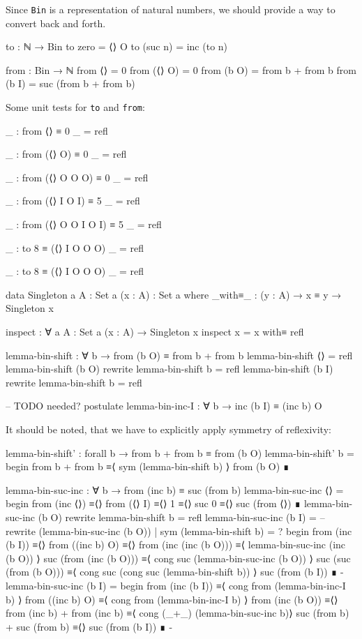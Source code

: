 Since \verb_Bin_ is a representation of natural numbers, we should provide
a way to convert back and forth.
\begin{code}
to : ℕ → Bin
to zero = ⟨⟩ O
to (suc n) = inc (to n)

from : Bin → ℕ
from ⟨⟩ = 0
from (⟨⟩ O) = 0
from (b O) = from b + from b
from (b I) = suc (from b + from b)
\end{code}

Some unit tests for \verb+to+ and \verb+from+:
\begin{code}
_ : from ⟨⟩ ≡ 0
_ = refl

_ : from (⟨⟩ O) ≡ 0
_ = refl

_ : from (⟨⟩ O O O) ≡ 0
_ = refl

_ : from (⟨⟩ I O I) ≡ 5
_ = refl

_ : from (⟨⟩ O O I O I) ≡ 5
_ = refl

_ : to 8 ≡ (⟨⟩ I O O O)
_ = refl

_ : to 8 ≡ (⟨⟩ I O O O)
_ = refl
\end{code}

\begin{code}
data Singleton {a} {A : Set a} (x : A) : Set a where
  _with≡_ : (y : A) → x ≡ y → Singleton x

inspect : ∀ {a} {A : Set a} (x : A) → Singleton x
inspect x = x with≡ refl

lemma-bin-shift : ∀ b → from (b O) ≡ from b + from b
lemma-bin-shift ⟨⟩ = refl
lemma-bin-shift (b O) rewrite lemma-bin-shift b = refl
lemma-bin-shift (b I) rewrite lemma-bin-shift b = refl

-- TODO needed?
postulate lemma-bin-inc-I : ∀ b → inc (b I) ≡ (inc b) O
\end{code}

It should be noted, that we have to explicitly apply symmetry of reflexivity:
\begin{code}
lemma-bin-shift' : forall b → from b + from b ≡ from (b O)
lemma-bin-shift' b =
  begin
    from b + from b
  ≡⟨ sym (lemma-bin-shift b) ⟩
   from (b O)
  ∎

lemma-bin-suc-inc : ∀ b → from (inc b) ≡ suc (from b)
lemma-bin-suc-inc ⟨⟩ =
  begin
    from (inc ⟨⟩)
  ≡⟨⟩
    from (⟨⟩ I)
  ≡⟨⟩
    1
  ≡⟨⟩
    suc 0
  ≡⟨⟩
    suc (from ⟨⟩)
  ∎
lemma-bin-suc-inc (b O) rewrite lemma-bin-shift b = refl
lemma-bin-suc-inc (b I) = -- rewrite (lemma-bin-suc-inc (b O)) | sym (lemma-bin-shift b)  = ?
  begin
    from (inc (b I))
  ≡⟨⟩
    from ((inc b) O)
  ≡⟨⟩
    from (inc (inc (b O)))
  ≡⟨ lemma-bin-suc-inc (inc (b O)) ⟩
    suc (from (inc (b O)))
  ≡⟨ cong suc (lemma-bin-suc-inc (b O)) ⟩
    suc (suc (from (b O)))
  ≡⟨ cong suc (cong suc (lemma-bin-shift b)) ⟩
    suc (from (b I))
  ∎
{-
lemma-bin-suc-inc (b I) =
  begin
    from (inc (b I))
  ≡⟨ cong from (lemma-bin-inc-I b) ⟩
    from ((inc b) O)
  ≡⟨ cong from (lemma-bin-inc-I b) ⟩
    from (inc (b O))
  ≡⟨⟩
   from (inc b) + from (inc b)
  ≡⟨ cong (_+_) (lemma-bin-suc-inc b)⟩
   suc (from b) + suc (from b)
  ≡⟨⟩
   suc (from (b I))
  ∎
-}
\end{code}

